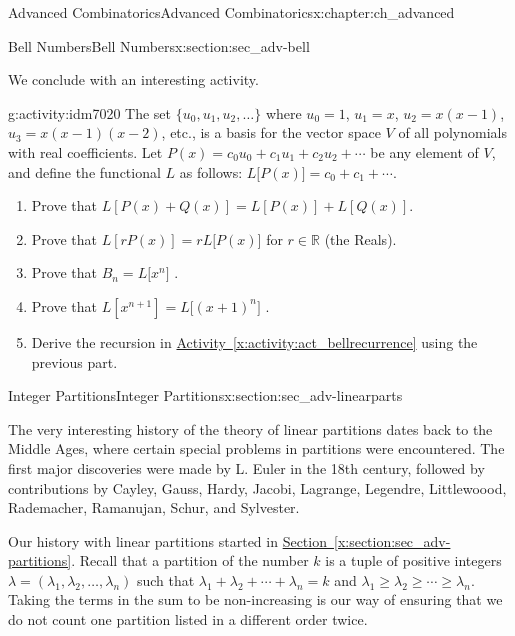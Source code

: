 \documentclass[oneside,10pt,]{book}
\numberwithin{equation}{chapter}
\def\R{\mathbb R}
\begin{document}
\begin{chapterptx}{Advanced Combinatorics}{}{Advanced Combinatorics}{}{}{x:chapter:ch_advanced}
\begin{sectionptx}{Bell Numbers}{}{Bell Numbers}{}{}{x:section:sec_adv-bell}
\par
We conclude with an interesting activity.%
\begin{activity}{}{g:activity:idm7020}%
The set \(\{u_{0}, u_{1}, u_{2}, \ldots \}\) where \(u_{0} = 1\), \(u_{1} = x\), \(u_{2} = x(x - 1)\), \(u_{3} = x(x - 1)(x - 2)\), etc., is a basis for the vector space \(V\) of all polynomials with real coefficients. Let \(P(x) = c_{0}u_{0} + c_{1}u_{1} + c_{2}u_{2} + \cdots\) be any element of \(V\), and define the functional \(L\) as follows: \(L\lbrack P(x)\rbrack = c_{0} + c_{1} + \cdots\).%
\par
%
\begin{enumerate}
\item{}Prove that \(L\left\lbrack P\left( x \right) + Q\left( x \right) \right\rbrack = L\left\lbrack P\left( x \right) \right\rbrack + L\left\lbrack Q\left( x \right) \right\rbrack.\)%
\item{}Prove that \(L\left\lbrack rP \left( x \right) \right\rbrack = rL\lbrack P\left( x \right)\rbrack\) for \(r \in \R\) (the Reals).%
\item{}Prove that \(B_{n} = L\lbrack x^{n}\rbrack\) .%
\item{}Prove that \(L\left\lbrack x^{n + 1} \right\rbrack = L\lbrack\left( x + 1 \right)^{n}\rbrack\) .%
\item{}Derive the recursion in \hyperref[x:activity:act_bellrecurrence]{Activity~\ref{x:activity:act_bellrecurrence}} using the previous part.%
\end{enumerate}
%
\end{activity}
\end{sectionptx}
%
%
\typeout{************************************************}
\typeout{************************************************}
%
\begin{sectionptx}{Integer Partitions}{}{Integer Partitions}{}{}{x:section:sec_adv-linearparts}
\begin{introduction}{}%
The very interesting history of the theory of linear partitions dates back to the Middle Ages, where certain special problems in partitions were encountered.  The first major discoveries were made by L. Euler in the 18th century, followed by contributions by Cayley, Gauss, Hardy, Jacobi, Lagrange, Legendre, Littlewoood, Rademacher, Ramanujan, Schur, and Sylvester.%
\par
Our history with linear partitions started in \hyperref[x:section:sec_adv-partitions]{Section~\ref{x:section:sec_adv-partitions}}.  Recall that a partition of the number \(k\) is a tuple of positive integers \(\lambda = (\lambda_1, \lambda_2, \ldots, \lambda_n)\) such that \(\lambda_1 + \lambda_2 + \cdots + \lambda_n = k\) and \(\lambda_1 \ge \lambda_2 \ge \cdots \ge \lambda_n\).  Taking the terms in the sum to be non-increasing is our way of ensuring that we do not count one partition listed in a different order twice.%

\end{introduction}
\end{sectionptx}
\end{chapterptx}
\end{document}
